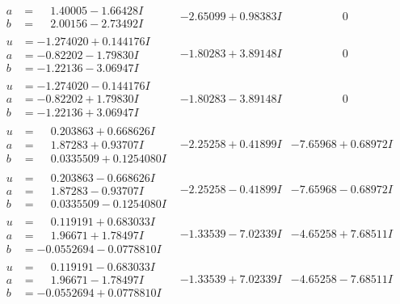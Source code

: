 \documentclass[1p]{elsarticle_modified}
\theoremstyle{definition}
\begin{document}
$$\begin{array}{c|c|c}
\begin{aligned}
a &= \phantom{-}1.40005 - 1.66428 I \\
b &= \phantom{-}2.00156 - 2.73492 I\end{aligned}
 & -2.65099 + 0.98383 I & \phantom{-0.000000 } 0 \\ \hline\begin{aligned}
u &= -1.274020 + 0.144176 I \\
a &= -0.82202 - 1.79830 I \\
b &= -1.22136 - 3.06947 I\end{aligned}
 & -1.80283 + 3.89148 I & \phantom{-0.000000 } 0 \\ \hline\begin{aligned}
u &= -1.274020 - 0.144176 I \\
a &= -0.82202 + 1.79830 I \\
b &= -1.22136 + 3.06947 I\end{aligned}
 & -1.80283 - 3.89148 I & \phantom{-0.000000 } 0 \\ \hline\begin{aligned}
u &= \phantom{-}0.203863 + 0.668626 I \\
a &= \phantom{-}1.87283 + 0.93707 I \\
b &= \phantom{-}0.0335509 + 0.1254080 I\end{aligned}
 & -2.25258 + 0.41899 I & -7.65968 + 0.68972 I \\ \hline\begin{aligned}
u &= \phantom{-}0.203863 - 0.668626 I \\
a &= \phantom{-}1.87283 - 0.93707 I \\
b &= \phantom{-}0.0335509 - 0.1254080 I\end{aligned}
 & -2.25258 - 0.41899 I & -7.65968 - 0.68972 I \\ \hline\begin{aligned}
u &= \phantom{-}0.119191 + 0.683033 I \\
a &= \phantom{-}1.96671 + 1.78497 I \\
b &= -0.0552694 - 0.0778810 I\end{aligned}
 & -1.33539 - 7.02339 I & -4.65258 + 7.68511 I \\ \hline\begin{aligned}
u &= \phantom{-}0.119191 - 0.683033 I \\
a &= \phantom{-}1.96671 - 1.78497 I \\
b &= -0.0552694 + 0.0778810 I\end{aligned}
 & -1.33539 + 7.02339 I & -4.65258 - 7.68511 I \\ \hline\begin{aligned}

\end{aligned}
\end{array}$$
\end{document}
